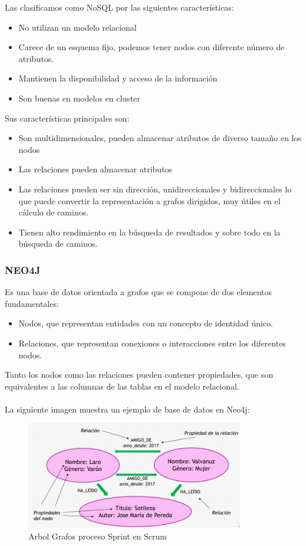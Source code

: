 \documentclass[preprint,12pt]{elsarticle}
\begin{document}
Las clasificamos como NoSQL por las siguientes características:
\begin{itemize}
     \item No utilizan un modelo relacional 
     \item Carece de un esquema fijo, podemos tener nodos con diferente número de atributos.  
     \item Mantienen la disponibilidad y acceso de la información
     \item Son buenas en modelos en cluster
\end{itemize}

Sus características principales son:
\begin{itemize}
 \item Son multidimensionales, pueden almacenar atributos de diverso tamaño en los nodos
 \item Las relaciones pueden almacenar atributos
 \item Las relaciones pueden ser sin dirección, unidireccionales y bidireccionales lo que puede convertir la representación a grafos dirigidos, muy útiles en el cálculo de caminos.
 \item Tienen alto rendimiento en la búsqueda de resultados y sobre todo en la búsqueda de caminos.
\end{itemize}


\subsubsection{\textbf{NEO4J}}
Es una base de datos orientada a grafos que se compone de dos elementos fundamentales:
\begin{itemize}
 \item Nodos, que representan entidades con un concepto de identidad único. 
 \item Relaciones, que representan conexiones o interacciones entre los diferentes nodos.
\end{itemize}
Tanto los nodos como las relaciones pueden contener propiedades, que son equivalentes a las columnas de las tablas en el modelo relacional. 
\\ \\ La siguiente imagen muestra un ejemplo de base de datos en Neo4j:

\begin{figure}[htb]
	\begin{center}
		\includegraphics[width=9.5cm]{./IMAGENES/ejemplo_neo4j} 
		\caption{Arbol Grafos proceso Sprint en Scrum}
	\end{center}
\end{figure}
\end{document}
